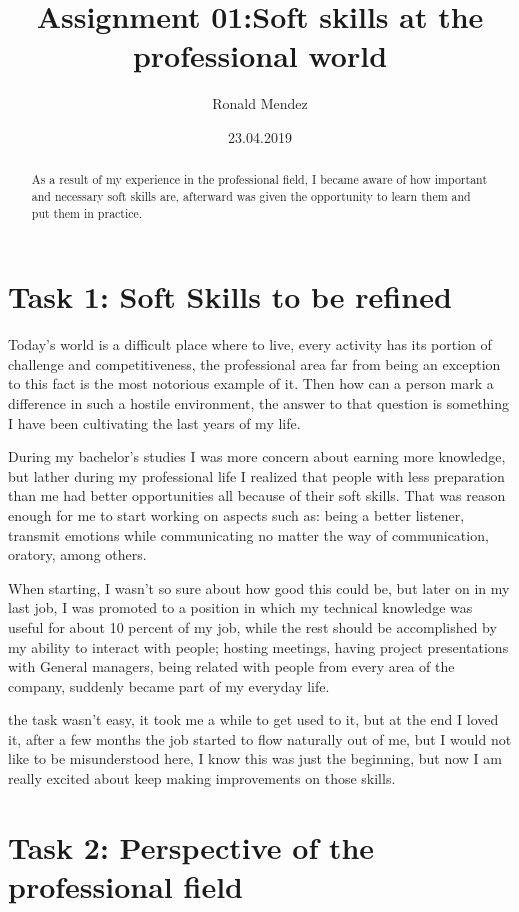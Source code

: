 \documentclass[a4paper, 12pt]{article}
\title{Assignment 01:Soft skills at the professional world }
\author{Ronald Mendez}
\date{23.04.2019}
\begin{document}
\maketitle
\begin{abstract}
    As a result of my experience in the professional field, I became aware of how important and necessary soft skills are, afterward was given the opportunity to learn them and put them in practice.
\end{abstract}
\section{Task 1: Soft Skills to be refined}
Today's world is a difficult place where to live, every activity has its portion of challenge and competitiveness, the professional area far from being an exception to this fact is the most notorious example of it. Then how can a person mark a difference in such a hostile environment, the answer to that question is something I have been cultivating the last years of my life.

During my bachelor's studies I was more concern about earning more knowledge, but lather during my professional life I realized that people with less preparation than me had better opportunities all because of their soft skills. That was reason enough for me to start working on aspects such as: being a better listener, transmit emotions while communicating no matter the way of communication, oratory, among others.

 When starting, I wasn't so sure about how good this could be, but later on in my last job, I was promoted to a position in which my technical knowledge was useful for about 10 percent of my job, while the rest should be accomplished by my ability to interact with people; hosting meetings, having project presentations with General managers, being related with people from every area of the company, suddenly became part of my everyday life.

the task wasn't easy, it took me a while to get used to it, but at the end I loved it, after a few months the job started to flow naturally out of me, but I would not like to be misunderstood here, I know this was just the beginning, but now I am really excited about keep making improvements on those skills. 

\section{Task 2: Perspective of the professional field}
\end{document}
